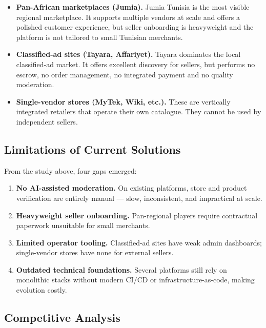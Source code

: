 \documentclass[12pt, a4paper, oneside]{report}
\begin{document}
\begin{itemize}[leftmargin=*,itemsep=4pt]
  \item \textbf{Pan-African marketplaces (Jumia).} Jumia Tunisia is
        the most visible regional marketplace. It supports multiple
        vendors at scale and offers a polished customer experience,
        but seller onboarding is heavyweight and the platform is not
        tailored to small Tunisian merchants.
  \item \textbf{Classified-ad sites (Tayara, Affariyet).} Tayara
        dominates the local classified-ad market. It offers excellent
        discovery for sellers, but performs no escrow, no order
        management, no integrated payment and no quality moderation.
  \item \textbf{Single-vendor stores (MyTek, Wiki, etc.).} These are
        vertically integrated retailers that operate their own
        catalogue. They cannot be used by independent sellers.
\end{itemize}

\subsection{Limitations of Current Solutions}

From the study above, four gaps emerged:

\begin{enumerate}[label=\textbf{L\arabic*.},leftmargin=*,itemsep=2pt]
  \item \textbf{No AI-assisted moderation.} On existing platforms,
        store and product verification are entirely manual --- slow,
        inconsistent, and impractical at scale.
  \item \textbf{Heavyweight seller onboarding.} Pan-regional players
        require contractual paperwork unsuitable for small merchants.
  \item \textbf{Limited operator tooling.} Classified-ad sites have
        weak admin dashboards; single-vendor stores have none for
        external sellers.
  \item \textbf{Outdated technical foundations.} Several platforms
        still rely on monolithic stacks without modern CI/CD or
        infrastructure-as-code, making evolution costly.
\end{enumerate}

\subsection{Competitive Analysis}
\end{document}

